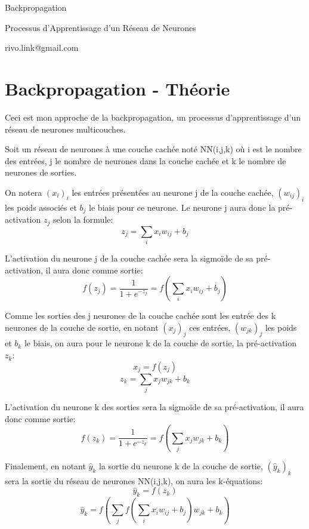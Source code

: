 \documentclass{article}
\begin{document}
\vspace*{\fill}
\begingroup
\centering
Backpropagation

Processus d'Apprentissage d'un Réseau de Neurones

rivo.link@gmail.com

\endgroup
\vspace*{\fill}

\newpage

\section{Backpropagation - Théorie}

\smallbreak
Ceci est mon approche de la backpropagation, un processus d'apprentissage d'un réseau de neurones multicouches.

\smallbreak
Soit un réseau de neurones à une couche cachée noté NN(i,j,k) où i est le nombre des entrées, j le nombre de neurones dans la couche cachée et k le nombre de neurones de sorties.

\smallbreak
On notera $(x_i)_i$ les entrées présentées au neurone j de la couche cachée, $(w_{ij})_i$ les poids associés et $b_j$ le biais pour ce neurone. Le neurone j aura donc la pré-activation $z_j$ selon la formule:
\begin{equation}
z_j=\sum_i{{x_i}{w_{ij}}}+b_j
\end{equation}

L'activation du neurone j de la couche cachée sera la sigmoïde de sa pré-activation, il aura donc comme sortie: 
\begin{equation}
f(z_j)=\frac{1}{1+e^{-z_j}}=f(\sum_i{{x_i}{w_{ij}}}+b_j)
\end{equation}

Comme les sorties des j neurones de la couche cachée sont les entrée des k neurones de la couche de sortie, en notant $(x_j)_j$ ces entrées, $(w_{jk})_j$ les poids et $b_k$ le biais, on aura pour le neurone k de la couche de sortie, la pré-activation $z_k$:
$$x_j=f(z_j)$$
\begin{equation}
z_k=\sum_j{x_j{w_{jk}}}+b_k
\end{equation}

L'activation du neurone k des sorties sera la sigmoïde de sa pré-activation, il aura donc comme sortie: 
\begin{equation}
f(z_k)=\frac{1}{1+e^{-z_k}}=f(\sum_j{x_j{w_{jk}}}+b_k)
\end{equation}

Finalement, en notant $\hat{y}_k$ la sortie du neurone k de la couche de sortie, $(\hat{y}_k)_k$ sera la sortie du réseau de neurones NN(i,j,k), on aura les k-équations:
$$\hat{y}_k=f(z_k)$$
\begin{equation}
\hat{y}_k=f(\sum_j{f(\sum_i{x_i{w_{ij}}}+b_j){w_{jk}}}+b_k)
\end{equation}
\end{document}
